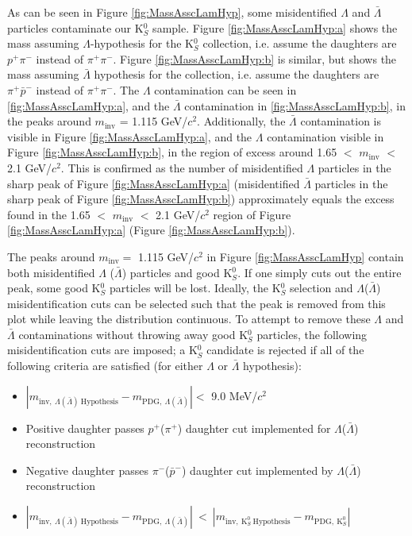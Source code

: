 \documentclass[ALICE,manyauthors]{cernphprep}
\begin{document}
As can be seen in Figure \ref{fig:MassAsscLamHyp}, some misidentified $\Lambda$ and $\bar{\Lambda}$ particles contaminate our K$^{0}_{S}$ sample.
Figure \ref{fig:MassAsscLamHyp:a} shows the mass assuming $\Lambda$-hypothesis for the K$^{0}_{S}$ collection, i.e. assume the daughters are $p^{+}\pi^{-}$ instead of $\pi^{+}\pi^{-}$.
Figure \ref{fig:MassAsscLamHyp:b} is similar, but shows the mass assuming $\bar{\Lambda}$ hypothesis for the collection, i.e. assume the daughters are $\pi^{+}\bar{p}^{-}$ instead of $\pi^{+}\pi^{-}$.
The $\Lambda$ contamination can be seen in \ref{fig:MassAsscLamHyp:a}, and the $\bar{\Lambda}$ contamination in \ref{fig:MassAsscLamHyp:b}, in the peaks around $m_{\mathrm{inv}}$ = 1.115 GeV/$c^{2}$.
Additionally, the $\bar{\Lambda}$ contamination is visible in Figure \ref{fig:MassAsscLamHyp:a}, and the $\Lambda$ contamination visible in Figure \ref{fig:MassAsscLamHyp:b}, in the region of excess around 1.65 $<$ $m_{\mathrm{inv}}$ $<$ 2.1 GeV/$c^{2}$.
This is confirmed as the number of misidentified $\Lambda$ particles in the sharp peak of Figure \ref{fig:MassAsscLamHyp:a} (misidentified $\bar{\Lambda}$ particles in the sharp peak of Figure \ref{fig:MassAsscLamHyp:b}) approximately equals the excess found in the 1.65 $<$ $m_{\mathrm{inv}}$ $<$ 2.1 GeV/$c^{2}$ region of Figure \ref{fig:MassAsscLamHyp:a} (Figure \ref{fig:MassAsscLamHyp:b}).

The peaks around $m_{\mathrm{inv}} = $ 1.115 GeV/$c^{2}$ in Figure \ref{fig:MassAsscLamHyp} contain both misidentified $\Lambda$ ($\bar{\Lambda}$) particles and good K$^{0}_{S}$.
If one simply cuts out the entire peak, some good K$^{0}_{S}$ particles will be lost.
Ideally, the K$^{0}_{S}$ selection and $\Lambda$($\bar{\Lambda}$) misidentification cuts can be selected such that the peak is removed from this plot while leaving the distribution continuous.
To attempt to remove these $\Lambda$ and $\bar{\Lambda}$ contaminations without throwing away good K$^{0}_{S}$ particles, the following misidentification cuts are imposed; a K$^{0}_{S}$ candidate is rejected if all of the following criteria are satisfied (for either $\Lambda$ or $\bar{\Lambda}$ hypothesis):
\begin{itemize}
 \item $\left|m_{\mathrm{inv}, \ \Lambda(\bar{\Lambda}) \ \mathrm{Hypothesis}} - m_{\mathrm{PDG},\ \Lambda(\bar{\Lambda})}\right| < $ 9.0 MeV/$c^{2}$
 \item Positive daughter passes $p^{+}$($\pi^{+}$) daughter cut implemented for $\Lambda$($\bar{\Lambda}$) reconstruction
 \item Negative daughter passes $\pi^{-}$($\bar{p}^{-}$) daughter cut implemented by $\Lambda$($\bar{\Lambda}$) reconstruction
 \item $\left|m_{\mathrm{inv}, \ \Lambda(\bar{\Lambda}) \ \mathrm{Hypothesis}} - m_{\mathrm{PDG},\ \Lambda(\bar{\Lambda})}\right|~ < ~\left|m_{\mathrm{inv},~ \mathrm{K}^{0}_{S}~ \mathrm{Hypothesis}} - m_{\mathrm{PDG},~ \mathrm{K}^{0}_{S}}\right|$
\end{itemize} 
\end{document}
